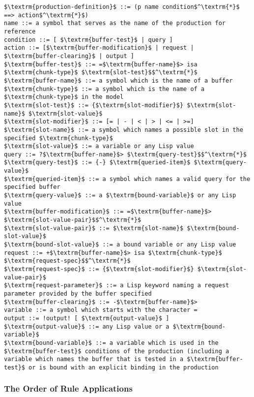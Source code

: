 \begin{lstlisting}[caption={The ACT-R production rule grammar}, label=lst:production_rule_grammar, basicstyle={\sffamily}, morekeywords={::=}, columns=flexible, mathescape]
$\textrm{production-definition}$ ::= (p name condition$^\textrm{*}$ ==> action$^\textrm{*}$)
name ::= a symbol that serves as the name of the production for reference
condition ::= [ $\textrm{buffer-test}$ | query ]
action ::= [$\textrm{buffer-modification}$ | request | $\textrm{buffer-clearing}$ | output ]
$\textrm{buffer-test}$ ::= =$\textrm{buffer-name}$> isa $\textrm{chunk-type}$ $\textrm{slot-test}$$^\textrm{*}$
$\textrm{buffer-name}$ ::= a symbol which is the name of a buffer
$\textrm{chunk-type}$ ::= a symbol which is the name of a $\textrm{chunk-type}$ in the model
$\textrm{slot-test}$ ::= {$\textrm{slot-modifier}$} $\textrm{slot-name}$ $\textrm{slot-value}$
$\textrm{slot-modifier}$ ::= [= | - | < | > | <= | >=]
$\textrm{slot-name}$ ::= a symbol which names a possible slot in the specified $\textrm{chunk-type}$
$\textrm{slot-value}$ ::= a variable or any Lisp value
query ::= ?$\textrm{buffer-name}$> $\textrm{query-test}$$^\textrm{*}$
$\textrm{query-test}$ ::= {-} $\textrm{queried-item}$ $\textrm{query-value}$
$\textrm{queried-item}$ ::= a symbol which names a valid query for the specified buffer
$\textrm{query-value}$ ::= a $\textrm{bound-variable}$ or any Lisp value
$\textrm{buffer-modification}$ ::= =$\textrm{buffer-name}$> $\textrm{slot-value-pair}$$^\textrm{*}$
$\textrm{slot-value-pair}$ ::= $\textrm{slot-name}$ $\textrm{bound-slot-value}$
$\textrm{bound-slot-value}$ ::= a bound variable or any Lisp value
request ::= +$\textrm{buffer-name}$> isa $\textrm{chunk-type}$ $\textrm{request-spec}$$^\textrm{*}$
$\textrm{request-spec}$ ::= {$\textrm{slot-modifier}$} $\textrm{slot-value-pair}$
$\textrm{request-parameter}$ ::= a Lisp keyword naming a request parameter provided by the buffer specified
$\textrm{buffer-clearing}$ ::= -$\textrm{buffer-name}$>
variable ::= a symbol which starts with the character =
output ::= !output! [ $\textrm{output-value}$ ]
$\textrm{output-value}$ ::= any Lisp value or a $\textrm{bound-variable}$
$\textrm{bound-variable}$ ::= a variable which is used in the $\textrm{buffer-test}$ conditions of the production (including a variable which names the buffer that is tested in a $\textrm{buffer-test}$ or is bound with an explicit binding in the production
\end{lstlisting}

\subsubsection{The Order of Rule Applications}
\label{implementation:rule_application_order}

